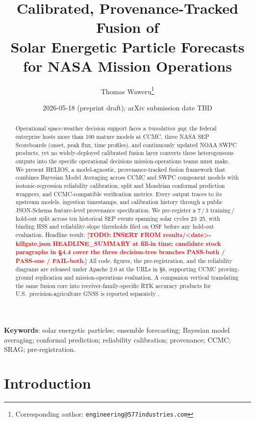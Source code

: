 \documentclass[11pt,letterpaper]{article}
\title{
  Calibrated, Provenance-Tracked Fusion of \\
  Solar Energetic Particle Forecasts \\
  for NASA Mission Operations
}
\author[1]{Thomas Waweru\thanks{Corresponding author: \texttt{engineering@577industries.com}}}
\author[1]{\todo{Named Senior ML Engineer}}
\author[2]{\todo{Named Space-Weather / Ionospheric SME}}
\affil[1]{577 Industries Inc., Columbus, OH, USA}
\affil[2]{Institutional affiliation TBD at submission}
\date{2026-05-18 (preprint draft); arXiv submission date TBD}
\newcommand{\todo}[1]{\textcolor{red}{\textbf{[TODO: #1]}}}
\begin{document}
\maketitle

\begin{abstract}
\noindent
Operational space-weather decision support faces a \emph{translation gap}: the
federal enterprise hosts more than 100 mature models at CCMC, three NASA
SEP Scoreboards (onset, peak flux, time profiles), and continuously updated
NOAA SWPC products, yet no widely-deployed calibrated fusion layer converts
these heterogeneous outputs into the specific operational decisions
mission-operations teams must make.  We present HELIOS, a model-agnostic,
provenance-tracked fusion framework that combines Bayesian Model Averaging
across CCMC and SWPC component models with isotonic-regression reliability
calibration, split and Mondrian conformal prediction wrappers, and CCMC-compatible
verification metrics.  Every output traces to its upstream models, ingestion
timestamps, and calibration history through a public JSON-Schema feature-level
provenance specification.  We pre-register a 7\,/\,3 training\,/\,hold-out
split across ten historical SEP events spanning solar cycles 23--25, with
binding HSS and reliability-slope thresholds filed on OSF before any hold-out
evaluation.  Headline result: \todo{INSERT FROM
results/<date>-killgate.json HEADLINE\_SUMMARY at fill-in time;
candidate stock paragraphs in §4.4 cover the three decision-tree branches
PASS-both / PASS-one / FAIL-both.}  All code, figures, the
pre-registration, and the reliability diagrams are released under Apache 2.0
at the URLs in §6, supporting CCMC proving-ground replication and
mission-operations evaluation.  A companion vertical translating the
same fusion core into receiver-family-specific RTK accuracy products for
U.S.\ precision-agriculture GNSS is reported separately
\cite{gannon_rtk}.
\end{abstract}

\bigskip
\noindent\textbf{Keywords}: solar energetic particles; ensemble forecasting;
Bayesian model averaging; conformal prediction; reliability calibration;
provenance; CCMC; SRAG; pre-registration.

\section{Introduction}
\label{sec:intro}
\end{document}
